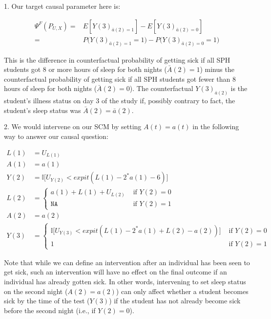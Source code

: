 \documentclass[answers]{exam}
\begin{document}
\begin{solution}

1. Our target causal parameter here is:

\begin{align*}
\Psi^F(P_{U,X}) = & E[Y(3)_{\bar{a}(2) = 1}] - E[Y(3)_{\bar{a}(2) = 0}] \\
= & P\big(Y(3)_{\bar{a}(2) = 1} = 1\big) - P\big(Y(3)_{\bar{a}(2) = 0} = 1\big)
\end{align*}


This is the difference in counterfactual probability of getting sick if all SPH students got 8 or more hours of sleep for both nights ($\bar{A}(2) = 1$) minus the counterfactual probability of getting sick if all SPH students got fewer than 8 hours of sleep for both nights ($\bar{A}(2) = 0$). The counterfactual $Y(3)_{\bar{a}(2)}$ is the student's illness status on day 3 of the study if, possibly contrary to fact, the student's sleep status was $\bar{A}(2)=\bar{a}(2)$.


2. We would intervene on our SCM by setting $A(t) = a(t)$ in the following way to answer our causal question:

\begin{align*}
L(1) &= U_{L(1)} \\
A(1) & = a(1) \\
Y(2) &= \mathbb{I} \big[U_{Y(2)} < expit(L(1) - 2^*a(1) - 6) \big] \\
L(2) &= 
    \begin{cases}
      a(1) + L(1) + U_{L(2)} & \text{ if } Y(2) = 0\ \\
      \texttt{NA} & \text{ if } Y(2) = 1
    \end{cases} \\
A(2) &= a(2) \\
Y(3) &=  
    \begin{cases}
      \mathbb{I} \big[ U_{Y(3)} < expit(L(1) - 2^*a(1) + L(2) - a(2)) \big] & \text{ if } Y(2) = 0\ \\
      1 & \text{ if } Y(2) = 1
    \end{cases} 
\end{align*}

Note that while we can define an intervention after an individual has been seen to get sick, such an intervention will have no effect on the final outcome if an individual has already gotten sick. In other words, intervening to set sleep status on the second night ($A(2) = a(2)$) can only affect whether a student becomes sick by the time of the test ($Y(3)$) if the student has not already become sick before the second night (i.e., if $Y(2) = 0$).

\end{solution}
\end{document}

